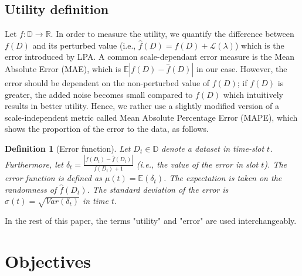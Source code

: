 \documentclass[11pt,a4paper]{article}
\theoremstyle{plain}
\newtheorem{definition}{Definition}
\theoremstyle{plain}
\theoremstyle{plain}
\theoremstyle{plain}
\theoremstyle{nonumberplain} \theoremseparator{}
\begin{document}
\subsection{Utility definition}
Let $f : \mathbb{D} \rightarrow \mathbb{R}$.
In order to measure the utility, we quantify the difference between $f(D)$ and its perturbed value (i.e., $\hat{f}(D) = f(D) +  \mathcal{L}(\lambda)$) which is the error introduced by LPA. A common scale-dependant error measure is the Mean Absolute Error (MAE), which is 
$\mathbb{E}| f(D) - \hat{f}(D)|$ in our case.
However, the error should be dependent on the non-perturbed value of $f(D)$; if
$f(D)$ is greater, the added noise becomes
small compared to $f(D)$ which intuitively results in better utility. Hence, we rather use a slightly
modified version of a scale-independent metric called Mean Absolute Percentage Error (MAPE), which shows the proportion of the error to the data, as follows.

\begin{definition}[Error function]
\label{def:utility}
Let $D_{t} \in \mathbb{D}$ denote a dataset in time-slot $t$.
Furthermore, let $\delta_{t} = \frac {| f(D_{t}) - \hat{f}(D_{t}) |}{f(D_{t})+1}$ (i.e., the value of the error in slot $t$). The error function is defined 
as $\mu(t) = \mathbb{E}(\delta_{t})$. The expectation is taken on the randomness of $\hat{f}(D_{t})$. 
The standard deviation of the error is $\sigma(t) = \sqrt{\mathit{Var}(\delta_{t})}$ in time $t$. 
\end{definition}




In the rest of this paper, the terms "utility" and "error" are used interchangeably.



\section{Objectives}
\end{document}
